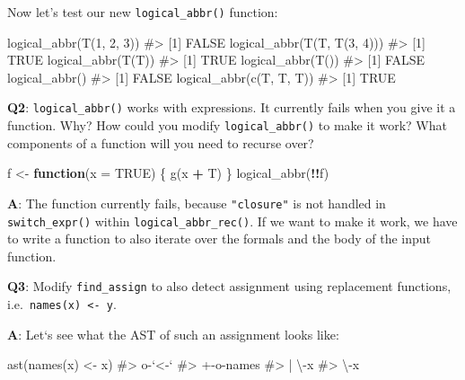 \documentclass[
]{krantz}
\makeatletter
\newenvironment{Shaded}{\begin{snugshade}}{\end{snugshade}}
\newcommand{\CommentTok}[1]{\textcolor[rgb]{0.56,0.35,0.01}{\textit{#1}}}
\newcommand{\ControlFlowTok}[1]{\textcolor[rgb]{0.13,0.29,0.53}{\textbf{#1}}}
\newcommand{\DataTypeTok}[1]{\textcolor[rgb]{0.13,0.29,0.53}{#1}}
\newcommand{\DecValTok}[1]{\textcolor[rgb]{0.00,0.00,0.81}{#1}}
\newcommand{\KeywordTok}[1]{\textcolor[rgb]{0.13,0.29,0.53}{\textbf{#1}}}
\newcommand{\NormalTok}[1]{#1}
\newcommand{\OperatorTok}[1]{\textcolor[rgb]{0.81,0.36,0.00}{\textbf{#1}}}
\newcommand{\OtherTok}[1]{\textcolor[rgb]{0.56,0.35,0.01}{#1}}
\newcommand{\StringTok}[1]{\textcolor[rgb]{0.31,0.60,0.02}{#1}}
\newenvironment{kframe}{%
\medskip{}
\setlength{\fboxsep}{.8em}
 \def\at@end@of@kframe{}%
 \ifinner\ifhmode%
  \def\at@end@of@kframe{\end{minipage}}%
  \begin{minipage}{\columnwidth}%
 \fi\fi%
 \def\FrameCommand##1{\hskip\@totalleftmargin \hskip-\fboxsep
 \colorbox{shadecolor}{##1}\hskip-\fboxsep
     \hskip-\linewidth \hskip-\@totalleftmargin \hskip\columnwidth}%
 \MakeFramed {\advance\hsize-\width
   \@totalleftmargin\z@ \linewidth\hsize
   \@setminipage}}%
 {\par\unskip\endMakeFramed%
 \at@end@of@kframe}
\renewenvironment{Shaded}{\begin{kframe}}{\end{kframe}}
\renewcommand{\KeywordTok} [1]{\textcolor[rgb]{0.00,0.44,0.13}{{#1}}}
\renewcommand{\DataTypeTok}[1]{\textcolor[rgb]{0.56,0.13,0.00}{{#1}}}
\renewcommand{\DecValTok}  [1]{\textcolor[rgb]{0.25,0.63,0.44}{{#1}}}
\renewcommand{\StringTok}  [1]{\textcolor[rgb]{0.25,0.44,0.63}{{#1}}}
\renewcommand{\CommentTok} [1]{\textcolor[rgb]{0.38,0.63,0.69}{{#1}}}
\renewcommand{\OtherTok}   [1]{\textcolor[rgb]{0.00,0.44,0.13}{{#1}}}
\renewcommand{\NormalTok}  [1]{{#1}}
\makeatother
\begin{document}
Now let's test our new \texttt{logical\_abbr()} function:

\begin{Shaded}
\begin{Highlighting}[]
\KeywordTok{logical_abbr}\NormalTok{(}\KeywordTok{T}\NormalTok{(}\DecValTok{1}\NormalTok{, }\DecValTok{2}\NormalTok{, }\DecValTok{3}\NormalTok{))}
\CommentTok{#> [1] FALSE}
\KeywordTok{logical_abbr}\NormalTok{(}\KeywordTok{T}\NormalTok{(T, }\KeywordTok{T}\NormalTok{(}\DecValTok{3}\NormalTok{, }\DecValTok{4}\NormalTok{)))}
\CommentTok{#> [1] TRUE}
\KeywordTok{logical_abbr}\NormalTok{(}\KeywordTok{T}\NormalTok{(T))}
\CommentTok{#> [1] TRUE}
\KeywordTok{logical_abbr}\NormalTok{(}\KeywordTok{T}\NormalTok{())}
\CommentTok{#> [1] FALSE}
\KeywordTok{logical_abbr}\NormalTok{()}
\CommentTok{#> [1] FALSE}
\KeywordTok{logical_abbr}\NormalTok{(}\KeywordTok{c}\NormalTok{(T, T, T))}
\CommentTok{#> [1] TRUE}
\end{Highlighting}
\end{Shaded}

\textbf{{Q2}}: \texttt{logical\_abbr()} works with expressions. It currently fails when you give it a function. Why? How could you modify \texttt{logical\_abbr()} to make it work? What components of a function will you need to recurse over?

\begin{Shaded}
\begin{Highlighting}[]
\NormalTok{f <-}\StringTok{ }\ControlFlowTok{function}\NormalTok{(}\DataTypeTok{x =} \OtherTok{TRUE}\NormalTok{) \{}
  \KeywordTok{g}\NormalTok{(x }\OperatorTok{+}\StringTok{ }\NormalTok{T)}
\NormalTok{\}}
\KeywordTok{logical_abbr}\NormalTok{(}\OperatorTok{!!}\NormalTok{f)}
\end{Highlighting}
\end{Shaded}

\textbf{{A}}: The function currently fails, because \texttt{"closure"} is not handled in \texttt{switch\_expr()} within \texttt{logical\_abbr\_rec()}. If we want to make it work, we have to write a function to also iterate over the formals and the body of the input function.

\textbf{{Q3}}: Modify \texttt{find\_assign} to also detect assignment using replacement functions, i.e.~\texttt{names(x)\ \textless{}-\ y}.

\textbf{{A}}: Let`s see what the AST of such an assignment looks like:

\begin{Shaded}
\begin{Highlighting}[]
\KeywordTok{ast}\NormalTok{(}\KeywordTok{names}\NormalTok{(x) <-}\StringTok{ }\NormalTok{x)}
\CommentTok{#> o-`<-` }
\CommentTok{#> +-o-names }
\CommentTok{#> | \textbackslash{}-x }
\CommentTok{#> \textbackslash{}-x}
\end{Highlighting}
\end{Shaded}
\end{document}

